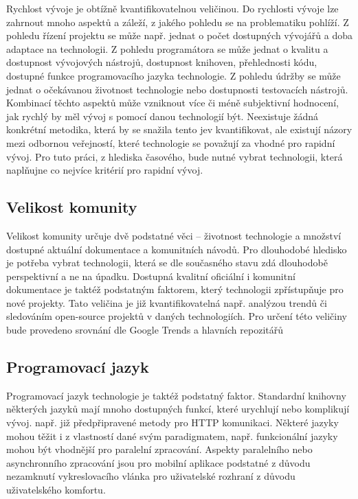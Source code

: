Rychlost vývoje je obtížně kvantifikovatelnou veličinou. Do rychlosti vývoje lze zahrnout mnoho aspektů a záleží, z jakého pohledu se na problematiku pohlíží. Z pohledu řízení projektu se může např. jednat o počet dostupných vývojářů a doba adaptace na technologii. Z pohledu programátora se může jednat o kvalitu a dostupnost vývojových nástrojů, dostupnost knihoven, přehlednosti kódu, dostupné funkce programovacího jazyka technologie. Z pohledu údržby se může jednat o očekávanou životnost technologie nebo dostupnosti testovacích nástrojů. Kombinací těchto aspektů může vzniknout více či méně subjektivní hodnocení, jak rychlý by měl vývoj s pomocí danou technologií být. Neexistuje žádná konkrétní metodika, která by se snažila tento jev kvantifikovat, ale existují názory mezi odbornou veřejností, které technologie se považují za vhodné pro rapidní vývoj. Pro tuto práci, z hlediska časového, bude nutné vybrat technologii, která naplňujne co nejvíce kritérií pro rapidní vývoj.

\subsection{Velikost komunity}

Velikost komunity určuje dvě podstatné věci -- životnost technologie a množství dostupné aktuální dokumentace a komunitních návodů. Pro dlouhodobé hledisko je potřeba vybrat technologii, která se dle současného stavu zdá dlouhodobě perspektivní a ne na úpadku. Dostupná kvalitní oficiální i komunitní dokumentace je taktéž podstatným faktorem, který technologii zpřístupňuje pro nové projekty. Tato veličina je již kvantifikovatelná např. analýzou trendů či sledováním open-source projektů v daných technologiích. Pro určení této veličiny bude provedeno srovnání dle Google Trends a hlavních repozitářů

\subsection{Programovací jazyk}

Programovací jazyk technologie je taktéž podstatný faktor. Standardní knihovny některých jazyků mají mnoho dostupných funkcí, které urychlují nebo komplikují vývoj. např. již předpřipravené metody pro HTTP komunikaci. Některé jazyky mohou těžit i z vlastností dané svým paradigmatem, např. funkcionální jazyky mohou být vhodnější pro paralelní zpracování. Aspekty paralelního nebo asynchronního zpracování jsou pro mobilní aplikace podstatné z důvodu nezamknutí vykreslovacího vlánka pro uživatelské rozhraní z důvodu uživatelského komfortu.

